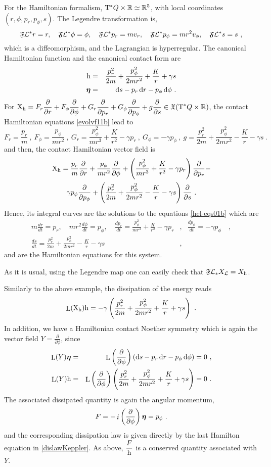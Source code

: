 \documentclass[12pt]{report}
\def\bea{\begin{eqnarray}}
\def\eea{\end{eqnarray}}
\def\beann{\begin{eqnarray*}}
\def\eeann{\end{eqnarray*}}
\def\dst{\displaystyle}
\def\derpar#1#2{\frac{\partial{#1}}{\partial{#2}}}
\def\vf{\mathfrak X}
\def\Lag{{\cal L}}
\def\d{{\rm d}}
\def\Real{\mathbb{R}}
\def\bmeta{\mbox{\boldmath $\eta$}}
\def\X{{\rm X}}
\def\Tan{{\rm T}}
\def\Lie{\mathop{\rm L}\nolimits}
\def\inn{\mathop{i}\nolimits}
\begin{document}
For the Hamiltonian formalism, $\Tan^*Q\times\Real\simeq\Real^5$,
with local coordinates $(r,\phi,p_r,p_\phi,s)$. The Legendre transformation is,
$$
\mathfrak{F}\Lag^*r=r  ,\quad \mathfrak{F}\Lag^*\phi=\phi ,\quad
\mathfrak{F}\Lag^*p_r=mv_r  ,\quad \mathfrak{F}\Lag^*p_\phi=mr^2v_\phi ,\quad \mathfrak{F}\Lag^*s=s  \ ,
$$
which is a diffeomorphism, and the Lagrangian is hyperregular.
The canonical Hamiltonian function and the canonical contact form are
\beann
{\rm h}&=&\frac{p_r^2}{2m}+\frac{p_\phi^2}{2mr^2}+\frac{K}{r}+\gamma s \\
\bmeta&=&\d s-p_r\,\d r-p_\phi\,\d\phi \ .
\eeann
For $\displaystyle \X_{\rm h}=F_r\derpar{}{r}+F_\phi\derpar{}{\phi}+
G_r\derpar{}{p_r}+G_\phi\derpar{}{p_\phi}+g\derpar{}{s}\in\vf(\Tan^*Q\times\Real)$,
the contact Hamiltonian equations \eqref{evolvf11b} lead to
$$
F_r=\frac{p_r}{m} \ , \ F_\phi=\frac{p_\phi}{mr^2} \ , \
G_r=\frac{p_\phi^2}{mr^3}+\frac{K}{r^2}-\gamma p_r \ , \ G_\phi=-\gamma p_\phi  \ , \ g=\frac{p_r^2}{2m}+\frac{p_\phi^2}{2mr^2}-\frac{K}{r}-\gamma s \ .
$$
and then, the contact Hamiltonian vector field is
\begin{multline*}
\X_{\rm h}=\frac{p_r}{m}\derpar{}{r}+\frac{p_\phi}{mr^2}\derpar{}{\phi}+\left(\frac{p_\phi^2}{mr^3}+
\frac{K}{r^2}-\gamma p_r\right)\derpar{}{p_r}-\\
\gamma p_\phi\derpar{}{p_\phi}+
\left(\frac{p_r^2}{2m}+\frac{p_\phi^2}{2mr^2}-
\frac{K}{r}-\gamma s\right)\derpar{}{s} \ .
\end{multline*}
Hence, its integral curves are the solutions to the equations \eqref{hel-eqs01b} which are
\bea
m\frac{dr}{dt} =p_r ,\quad mr^2\frac{d\phi}{dt} =p_\phi ,\quad
\frac{dp_r}{dt}=\frac{p_\phi^2}{mr^3}+\frac{K}{r^2}-\gamma p_r & , &
\frac{dp_\phi}{dt}=-\gamma p_\phi \quad ,
\label{dislawKeppler} \\
\frac{ds}{dt}=\frac{p_r^2}{2m}+\frac{p_\phi^2}{2mr^2}-\frac{K}{r}-\gamma s & , & \nonumber
\eea
and are the Hamiltonian equations for this system.

As it is usual, using the Legendre map
one can easily check that $\mathfrak{F}\Lag_*X_\Lag=X_{\rm h}$.

Similarly to the above example,
the dissipation of the energy reads
$$
\Lie(\X_{\rm h}){\rm h}=-\gamma \left(\frac{p_r^2}{2m}+\frac{p_\phi^2}{2mr^2}+\frac{K}{r}+\gamma s\right)\ .
$$
In addition, we have a Hamiltonian contact Noether symmetry which is again the
vector field $\dst Y=\derpar{}{\phi}$, since
\beann
\Lie(Y)\bmeta&=& 
\Lie\left(\derpar{}{\phi}\right)\left(\d s-p_r\,\d r-p_\phi\,\d\phi\right) =0 \ , 
\\
\Lie(Y){\rm h}&=& 
\Lie\left(\derpar{}{\phi}\right)\left(\frac{p_r^2}{2m}+\frac{p_\phi^2}{2mr^2}+\frac{K}{r}+\gamma s\right)=0 \ .
\eeann
The associated dissipated quantity is again the angular momentum,
$$
F=-\inn\left(\derpar{}{\phi}\right)\bmeta=p_\phi \ .
$$
and the corresponding dissipation law is given directly by the last Hamilton equation in \eqref{dislawKeppler}.
As above, $\dst\frac{F}{{\rm h}}$ is a conserved quantity associated with $Y$.
\end{document}
